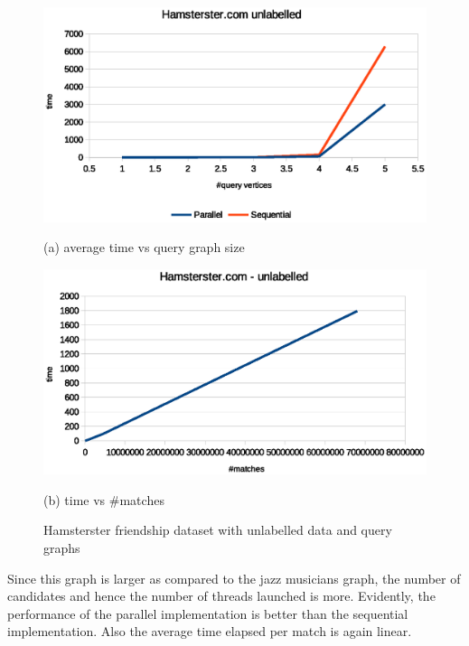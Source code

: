 \begin{figure}[H]
    \centering
    \begin{minipage}[b]{.45\textwidth}
        \hspace*{-0.5in}
        \includegraphics[scale=0.55]{images/hamsterster_unlabelled.eps}
        \caption*{(a) average time vs query graph size}        
    \end{minipage} \hfill  
    \begin{minipage}[b]{.45\textwidth}
        \hspace*{-0.2in}
        \includegraphics[scale=0.55]{images/hamsterster_unlabelled_tpm.eps}
        \caption*{(b) time vs \#matches}       
    \end{minipage}   
\caption{Hamsterster friendship dataset with unlabelled data and query graphs}
\label{fig:distmx}
\end{figure}

Since this graph is larger as compared to the jazz musicians graph, the number of candidates and hence the number of threads launched is more. Evidently, the performance of the parallel implementation is better than the sequential implementation. Also the average time elapsed per match is again linear.

